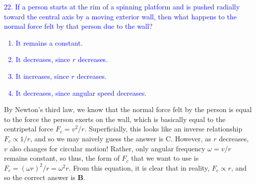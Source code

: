 \documentclass{article}
\theoremstyle{plain}%
\theoremstyle{definition}
\theoremstyle{remark}
\begin{document}
\begin{center}
\begin{minipage}{30em}
\textcolor{blue}{22. If a person starts at the rim of a spinning platform and is pushed radially toward the central axis by a moving exterior wall, then what happens to the normal force felt by that person due to the wall?
\begin{enumerate}[label=\Alph*]
	\item It remains a constant.
	\item It decreases, since $r$ decreases.
	\item It increases, since $r$ decreases. 
	\item It decreases, since angular speed decreases.
\end{enumerate}}
\end{minipage}
\end{center}
\indent By Newton's third law, we know that the normal force felt by the person is equal to the force the person exerts on the wall, which is basically equal to the centripetal force $F_c=v^2/r$. Superficially, this looks like an inverse relationship $F_c\propto 1/r$, and so we may naively guess the answer is C. However, as $r$ decreases, $v$ also changes for circular motion! Rather, only angular frequency $\omega=v/r$ remains constant, so thus, the form of $F_c$ that we want to use is $F_c=\left(\omega r\right)^2/r=\omega^2r$. From this equation, it is clear that in reality, $F_c\propto r$, and so the correct answer is \textbf{B}.
\end{document}
